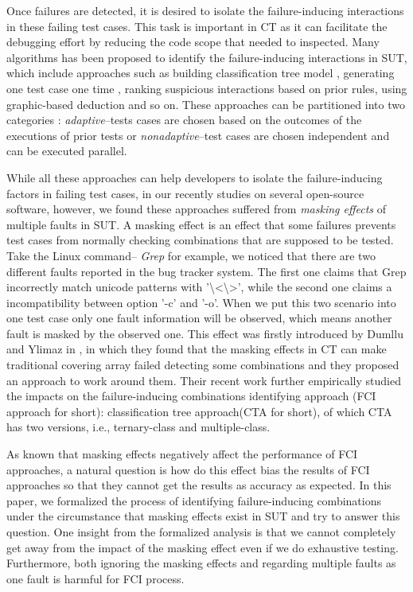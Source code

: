 \documentclass{sig-alternate}
\begin{document}
Once failures are detected, it is desired to isolate the failure-inducing interactions in these failing test cases. This task is important in CT as it can facilitate the debugging effort by reducing the code scope that needed to inspected. Many algorithms has been proposed to identify the failure-inducing interactions in SUT, which include approaches such as building classification tree model \cite{yilmaz2006covering}, generating one test case one time \cite{nie2011minimal}, ranking suspicious interactions based on prior rules\cite{ghandehari2012identifying}, using graphic-based deduction \cite{martinez2008algorithms} and so on. These approaches can be partitioned into two categories \cite{colbourn2008locating}: \emph{adaptive}--tests cases are chosen based on the outcomes of the executions of prior tests or \emph{nonadaptive}--test cases are chosen independent and can be executed parallel.

While all these approaches can help developers to isolate the failure-inducing factors in failing test cases, in our recently studies on several open-source software, however, we found these approaches suffered from \emph{masking effects} of multiple faults in SUT. A masking effect \cite{dumlu2011feedback,yilmaz2013reducing} is an effect that some failures prevents test cases from normally checking combinations that are supposed to be tested. Take the Linux command-- \emph{Grep} for example, we noticed that there are two different faults reported in the bug tracker system. The first one\cite{grepIncorrectlyMatch} claims that Grep incorrectly match unicode patterns with '\textbackslash<\textbackslash>', while the second one\cite{grepCountAndO} claims a incompatibility between option '-c' and '-o'. When we put this two scenario into one test case only one fault information will be observed, which means another fault is masked by the observed one. This effect was firstly introduced by Dumllu and Ylimaz in \cite{dumlu2011feedback}, in which they found that the masking effects in CT can make traditional covering array failed detecting some combinations and they proposed an approach to work around them. Their recent work \cite{yilmaz2013reducing} further empirically studied the impacts on the failure-inducing combinations identifying approach (FCI approach for short):  classification tree approach(CTA for short)\cite{yilmaz2006covering}, of which CTA has two versions, i.e., ternary-class and multiple-class.

As known that masking effects negatively affect the performance of FCI approaches, a natural question is how do this effect bias the results of FCI approaches so that they cannot get the results as accuracy as expected. In this paper, we formalized the process of identifying failure-inducing combinations under the circumstance that masking effects exist in SUT and try to answer this question. One insight from the formalized analysis is that we cannot completely get away from the impact of the masking effect even if we do exhaustive testing. Furthermore, both ignoring the masking effects and regarding multiple faults as one fault is harmful for FCI process. 
\end{document}
